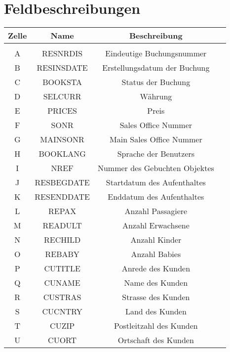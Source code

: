 
\appendix
\chapter{Feldbeschreibungen}
\label{app:feldbeschreibungen}

\begin{longtable}{ | c | c | c | c |} 
	\hline 
	\rowcolor{tableheadcolor}
	\bfseries Zelle & \bfseries Name & \bfseries Beschreibung \\ \hline 
	
	\rowcolor{tableheadcolor}
	\multicolumn{3}{|c|}{\textbf{Buchungsdaten}} \\ \hline
	A & RESNRDIS & Eindeutige Buchungsnummer \\ \hline 
	B & RESINSDATE & Erstellungsdatum der Buchung \\ \hline 
	C & BOOKSTA & Status der Buchung \\ \hline 
	D & SELCURR & Währung \\ \hline 
	E & PRICES & Preis \\ \hline 
	F & SONR & Sales Office Nummer \\ \hline 
	G & MAINSONR & Main Sales Office Nummer \\ \hline 
	H & BOOKLANG & Sprache der Benutzers \\ \hline 
	I & NREF & Nummer des Gebuchten Objektes \\ \hline 
	J & RESBEGDATE & Startdatum des Aufenthaltes \\ \hline 
	K & RESENDDATE & Enddatum des Aufenthaltes \\ \hline 
	L & REPAX & Anzahl Passagiere \\ \hline 
	M & READULT & Anzahl Erwachsene \\ \hline 
	N & RECHILD & Anzahl Kinder \\ \hline 
	O & REBABY & Anzahl Babies \\ \hline 
	P & CUTITLE & Anrede des Kunden \\ \hline 
	Q & CUNAME & Name des Kunden \\ \hline 
	R & CUSTRAS & Strasse des Kunden \\ \hline 
	S & CUCNTRY & Land des Kunden \\ \hline 
	T & CUZIP & Postleitzahl des Kunden \\ \hline 
	U & CUORT & Ortschaft des Kunden \\ \hline 
	

\end{longtable}
